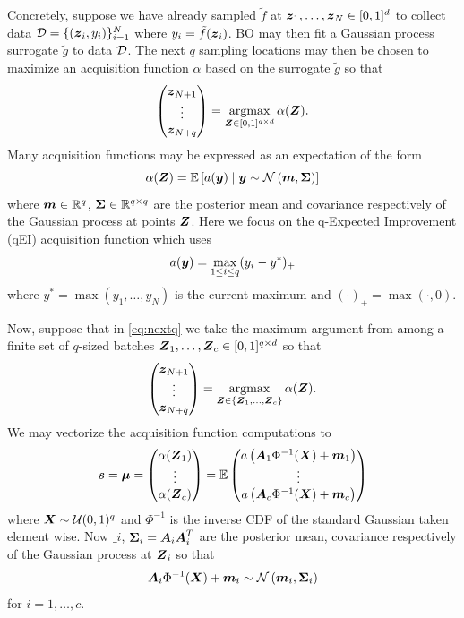 \documentclass{article}[12pt]
\begin{document}
Concretely, suppose we have already sampled $\tilde{f}$ at $\boldsymbol{z}_1,\dots,\boldsymbol{z}_{N} \in [0,1]^{d}$ to collect data $\mathcal{D}=\{(\boldsymbol{z}_i,y_i)\}_{i=1}^N$ where $y_i = \tilde{f}(\boldsymbol{z}_i)$. BO may then fit a Gaussian process surrogate $\tilde{g}$ to data $\mathcal{D}$. The next $q$ sampling locations may then be chosen to maximize  an acquisition function $\alpha$ based on the surrogate $\tilde{g}$ so that 
\begin{equation}
    \begin{pmatrix}\boldsymbol{z}_{N+1} \\ \vdots \\ \boldsymbol{z}_{N+q}\end{pmatrix} = \operatorname*{argmax}_{\boldsymbol{Z} \in [0,1]^{q \times d}}\alpha(\boldsymbol{Z}).
    \label{eq:nextq}
\end{equation}
Many acquisition functions may be expressed as an expectation of the form
$$\alpha(\boldsymbol{Z}) = \mathbb{E}\left[a(\boldsymbol{y}) \mid \boldsymbol{y} \sim \mathcal{N}\left(\boldsymbol{m},\boldsymbol{\Sigma}\right)\right]$$
where $\boldsymbol{m} \in \mathbb{R}^{q}$, $\boldsymbol{\Sigma} \in \mathbb{R}^{q \times q}$ are the posterior mean and covariance respectively of the Gaussian process at points $\boldsymbol{Z}$. Here we focus on the q-Expected Improvement (qEI) acquisition function which uses 
$$a(\boldsymbol{y}) = \max_{1 \leq i \leq q} (y_i - y^*)_+$$
where $y^*= \max\left(y_1,\dots,y_N\right)$ is the current maximum and $(\cdot)_+ = \max(\cdot,0)$. 

Now, suppose that in \eqref{eq:nextq} we take the maximum argument from among a finite set of $q$-sized batches $\boldsymbol{Z}_1,\dots,\boldsymbol{Z}_c \in [0,1]^{q \times d}$ so that 
\begin{equation}
    \begin{pmatrix}\boldsymbol{z}_{N+1} \\ \vdots \\ \boldsymbol{z}_{N+q}\end{pmatrix} = \operatorname*{argmax}_{\boldsymbol{Z} \in \{\boldsymbol{Z}_1,\dots,\boldsymbol{Z}_c\}}\alpha(\boldsymbol{Z}).
    \label{eq:nextq_discrete}
\end{equation}
We may vectorize the acquisition function computations to 
\begin{equation}
    \boldsymbol{s} = \boldsymbol{\mu} = \begin{pmatrix} \alpha(\boldsymbol{Z}_1) \\ \vdots \\ \alpha(\boldsymbol{Z}_c)\end{pmatrix} = \mathbb{E}\begin{pmatrix}a\left(\boldsymbol{A}_1\Phi^{-1}(\boldsymbol{X})+\boldsymbol{m}_1\right) \\ \vdots \\ a\left(\boldsymbol{A}_c\Phi^{-1}(\boldsymbol{X})+\boldsymbol{m}_c\right)\end{pmatrix}
    \label{eq:bs_qei}
\end{equation}
where $\boldsymbol{X} \sim \mathcal{U}(0,1)^q$ and $\Phi^{-1}$ is the inverse CDF of the standard Gaussian taken element wise. Now $\bm_i$, $\boldsymbol{\Sigma}_i = \boldsymbol{A}_i\boldsymbol{A}_i^T$ are the posterior mean, covariance respectively of the Gaussian process at $\boldsymbol{Z}_i$ so that 
$$\boldsymbol{A}_i\Phi^{-1}(\boldsymbol{X})+\boldsymbol{m}_i \sim \mathcal{N}\left(\boldsymbol{m}_i,\boldsymbol{\Sigma}_i\right)$$
for $i=1,\dots,c$.
\end{document}
